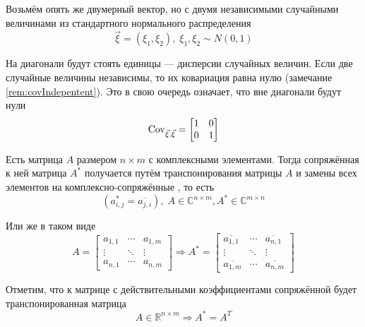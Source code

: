 \begin{example}
  Возьмём опять же двумерный вектор, но с двумя независимыми
  случайными величинами из стандартного нормального распределения
  $$\vec{\xi} = \left( \xi_1, \xi_2 \right),\;
      \xi_1, \xi_2 \sim N\left( 0, 1 \right)$$

  На диагонали будут стоять единицы --- дисперсии случайных величин.
  Если две случайные величины независимы, то их ковариация равна нулю
  (замечание \ref{rem:covIndepentent}).
  Это в свою очередь означает, что вне диагонали
  будут нули
  $$\operatorname{Cov}^{}_{\vec{\xi}, \vec{\xi}} =
  \begin{bmatrix}
      1 & 0 \\
      0 & 1
  \end{bmatrix}$$
\end{example}

\begin{definition}
  Есть матрица $A$ размером $n \times m$ с комплексными элементами.
  Тогда сопряжённая к ней матрица $A^*$ получается путём транспонирования
  матрицы $A$ и замены всех элементов на комплексно-сопряжённые
  \cite[с.~243]{VoevodinLA}, то есть
  $$\left( a_{i,j}^* = \overline{a_{j,i}} \right),\;
  A \in \mathbb{C}^{n \times m}, A^* \in \mathbb{C}^{m \times n}$$

  Или же в таком виде
  $$A =
  \begin{bmatrix}
      a_{1,1} & \cdots & a_{1,m} \\
      \vdots & \ddots & \vdots \\
      a_{n,1} & \cdots & a_{n,m}
  \end{bmatrix}
      \Rightarrow
  A^* = 
  \begin{bmatrix}
      \overline{a_{1,1}} & \cdots & \overline{a_{n,1}} \\
      \vdots & \ddots & \vdots \\
      \overline{a_{1,m}} & \cdots & \overline{a_{n,m}}
  \end{bmatrix}$$
\end{definition}

\begin{remark}
  Отметим, что к матрице с действительными коэффициентами сопряжённой будет
  транспонированная матрица
  $$A \in \mathbb{R}^{n \times m} \Rightarrow A^* = A^T$$
\end{remark}

